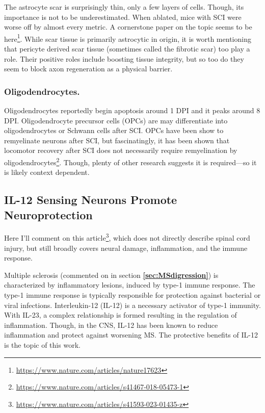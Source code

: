 The astrocyte scar is surprisingly thin, only a few layers of cells. Though, its importance is not to be underestimated. When ablated, mice with SCI were worse off by almost every metric. A cornerstone paper on the topic seems to be here\footnote{\url{https://www.nature.com/articles/nature17623}}. While scar tissue is primarily astrocytic in origin, it is worth mentioning that pericyte derived scar tissue (sometimes called the fibrotic scar) too play a role. Their positive roles include boosting tissue integrity, but so too do they seem to block axon regeneration as a physical barrier. 

\subsubsection{Oligodendrocytes.}
Oligodendrocytes reportedly begin apoptosis around 1 DPI and it peaks around 8 DPI. Oligodendrocyte precursor cells (OPCs) are may differentiate into oligodendrocytes or Schwann cells after SCI. OPCs have been show to remyelinate neurons after SCI, but fascinatingly, it has been shown that locomotor recovery after SCI does not necessarily require remyelination by oligodendrocytes\footnote{\url{https://www.nature.com/articles/s41467-018-05473-1}}. Though, plenty of other research suggests it is required---so it is likely context dependent. 

\subsection{IL-12 Sensing Neurons Promote Neuroprotection}

Here I'll comment on this article\footnote{\url{https://www.nature.com/articles/s41593-023-01435-z}}, which does not directly describe spinal cord injury, but still broadly covers neural damage, inflammation, and the immune response.\newline

Multiple sclerosis (commented on in section \textbf{\ref{sec:MSdigression}}) is characterized by inflammatory lesions, induced by type-1 immune response. The type-1 immune response is typically responsible for protection against bacterial or viral infections. 
Interleukin-12 (IL-12) is a necessary activator of type-1 immunity. With IL-23, a complex relationship is formed resulting in the regulation of inflammation. Though, in the CNS, IL-12 has been known to reduce inflammation and protect against worsening MS. The protective benefits of IL-12 is the topic of this work.\newline

